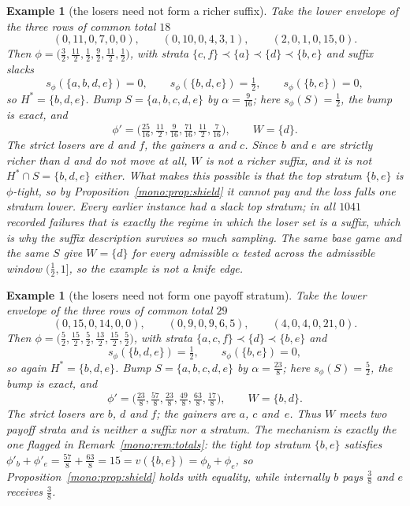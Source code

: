 \documentclass[11pt]{article}
\newtheorem{example}[theorem]{Example}
\begin{document}
\begin{example}[the losers need not form a richer suffix]
\label{mono:ex:notsuffix}
Take the lower envelope of the three rows of common total $18$
\[
 (0,11,0,7,0,0),\qquad(0,10,0,4,3,1),\qquad(2,0,1,0,15,0).
\]
Then $\phi=\bigl(\tfrac32,\tfrac{11}2,\tfrac12,\tfrac92,\tfrac{11}2,
\tfrac12\bigr)$, with strata
$\{c,f\}\prec\{a\}\prec\{d\}\prec\{b,e\}$ and suffix slacks
\[
 s_\phi(\{a,b,d,e\})=0,\qquad s_\phi(\{b,d,e\})=\tfrac12,\qquad
 s_\phi(\{b,e\})=0 ,
\]
so $H^*=\{b,d,e\}$.  Bump $S=\{a,b,c,d,e\}$ by $\alpha=\tfrac9{16}$; here
$s_\phi(S)=\tfrac12$, the bump is exact, and
\[
 \phi'=\bigl(\tfrac{25}{16},\tfrac{11}2,\tfrac9{16},\tfrac{71}{16},
 \tfrac{11}2,\tfrac7{16}\bigr),\qquad W=\{d\}.
\]
The strict losers are $d$ and $f$, the gainers $a$ and $c$.  Since $b$ and
$e$ are strictly richer than $d$ and do not move at all, $W$ is not a richer
suffix, and it is not $H^*\cap S=\{b,d,e\}$ either.  What makes this possible
is that the top stratum $\{b,e\}$ is $\phi$-tight, so by
Proposition~\ref{mono:prop:shield} it cannot pay and the loss falls one
stratum lower.  Every earlier instance had a slack top stratum; in all $1041$ recorded
failures that is exactly the regime in which the loser set is a suffix,
which is why the suffix description survives so much sampling.  The same base game and the
same $S$ give $W=\{d\}$ for every admissible
$\alpha$ tested across the admissible window $\bigl(\tfrac12,1\bigr]$, so the
example is not a knife edge.
\end{example}

\begin{example}[the losers need not form one payoff stratum]
\label{mono:ex:notstratum}
Take the lower envelope of the three rows of common total $29$
\[
 (0,15,0,14,0,0),\qquad(0,9,0,9,6,5),\qquad(4,0,4,0,21,0).
\]
Then $\phi=\bigl(\tfrac52,\tfrac{15}2,\tfrac52,\tfrac{13}2,\tfrac{15}2,
\tfrac52\bigr)$, with strata $\{a,c,f\}\prec\{d\}\prec\{b,e\}$ and
\[
 s_\phi(\{b,d,e\})=\tfrac12,\qquad s_\phi(\{b,e\})=0 ,
\]
so again $H^*=\{b,d,e\}$.  Bump $S=\{a,b,c,d,e\}$ by $\alpha=\tfrac{23}8$;
here $s_\phi(S)=\tfrac52$, the bump is exact, and
\[
 \phi'=\bigl(\tfrac{23}8,\tfrac{57}8,\tfrac{23}8,\tfrac{49}8,\tfrac{63}8,
 \tfrac{17}8\bigr),\qquad W=\{b,d\}.
\]
The strict losers are $b$, $d$ and $f$; the gainers are $a$, $c$ and~$e$.
Thus $W$ meets two payoff strata and is neither a suffix nor a stratum.  The
mechanism is exactly the one flagged in Remark~\ref{mono:rem:totals}: the
tight top stratum $\{b,e\}$ satisfies
$\phi'_b+\phi'_e=\tfrac{57}8+\tfrac{63}8=15=v(\{b,e\})=\phi_b+\phi_e$, so
Proposition~\ref{mono:prop:shield} holds with equality, while internally $b$
pays $\tfrac38$ and $e$ receives $\tfrac38$.
\end{example}
\end{document}
